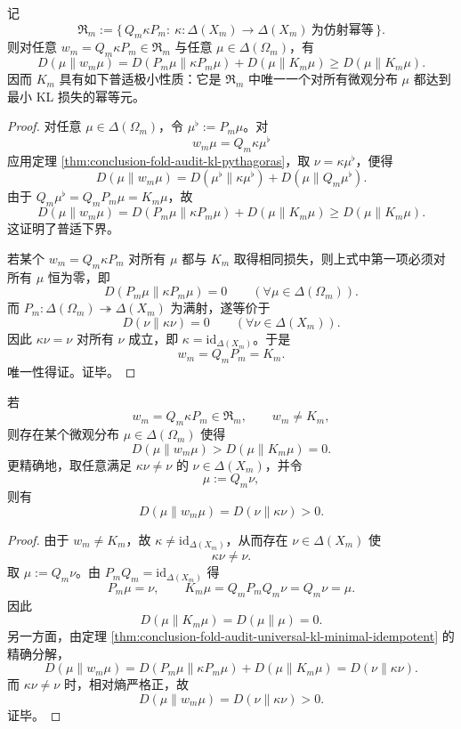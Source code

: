\begin{theorem}[\texorpdfstring{$K_m=Q_mP_m$}{Km=QmPm} 是全部审计幂等中的普适 KL 极小元]\label{thm:conclusion-fold-audit-universal-kl-minimal-idempotent}
记
\[
\mathfrak R_m:=
\{\,Q_m\kappa P_m:\ \kappa:\Delta(X_m)\to\Delta(X_m)\ \text{为仿射幂等}\,\}.
\]
则对任意 \(w_m=Q_m\kappa P_m\in\mathfrak R_m\) 与任意 \(\mu\in\Delta(\Omega_m)\)，有
\[
D(\mu\|w_m\mu)
=
D(P_m\mu\|\kappa P_m\mu)+D(\mu\|K_m\mu)
\ge
D(\mu\|K_m\mu).
\]
因而 \(K_m\) 具有如下普适极小性质：它是 \(\mathfrak R_m\) 中唯一一个对所有微观分布 \(\mu\) 都达到最小 KL 损失的幂等元。
\end{theorem}
\begin{proof}
对任意 \(\mu\in\Delta(\Omega_m)\)，令 \(\mu^\flat:=P_m\mu\)。对
\[
w_m\mu=Q_m\kappa\mu^\flat
\]
应用定理 \ref{thm:conclusion-fold-audit-kl-pythagoras}，取 \(\nu=\kappa\mu^\flat\)，便得
\[
D(\mu\|w_m\mu)
=
D(\mu^\flat\|\kappa\mu^\flat)+D(\mu\|Q_m\mu^\flat).
\]
由于 \(Q_m\mu^\flat=Q_mP_m\mu=K_m\mu\)，故
\[
D(\mu\|w_m\mu)
=
D(P_m\mu\|\kappa P_m\mu)+D(\mu\|K_m\mu)
\ge
D(\mu\|K_m\mu).
\]
这证明了普适下界。

若某个 \(w_m=Q_m\kappa P_m\) 对所有 \(\mu\) 都与 \(K_m\) 取得相同损失，则上式中第一项必须对所有 \(\mu\) 恒为零，即
\[
D(P_m\mu\|\kappa P_m\mu)=0\qquad (\forall \mu\in\Delta(\Omega_m)).
\]
而 \(P_m:\Delta(\Omega_m)\twoheadrightarrow \Delta(X_m)\) 为满射，遂等价于
\[
D(\nu\|\kappa\nu)=0\qquad (\forall \nu\in\Delta(X_m)).
\]
因此 \(\kappa\nu=\nu\) 对所有 \(\nu\) 成立，即 \(\kappa=\mathrm{id}_{\Delta(X_m)}\)。于是
\[
w_m=Q_mP_m=K_m.
\]
唯一性得证。证毕。
\end{proof}

\begin{theorem}\label{thm:conclusion-fold-audit-nonminimal-idempotent-pointwise-kl-witness}
若
\[
w_m=Q_m\kappa P_m\in\mathfrak R_m,
\qquad
w_m\neq K_m,
\]
则存在某个微观分布 \(\mu\in\Delta(\Omega_m)\) 使得
\[
D(\mu\|w_m\mu)>D(\mu\|K_m\mu)=0.
\]
更精确地，取任意满足 \(\kappa\nu\neq \nu\) 的 \(\nu\in\Delta(X_m)\)，并令
\[
\mu:=Q_m\nu,
\]
则有
\[
D(\mu\|w_m\mu)=D(\nu\|\kappa\nu)>0.
\]
\end{theorem}
\begin{proof}
由于 \(w_m\neq K_m\)，故 \(\kappa\neq \mathrm{id}_{\Delta(X_m)}\)，从而存在 \(\nu\in\Delta(X_m)\) 使
\[
\kappa\nu\neq \nu.
\]
取 \(\mu:=Q_m\nu\)。由 \(P_mQ_m=\mathrm{id}_{\Delta(X_m)}\) 得
\[
P_m\mu=\nu,
\qquad
K_m\mu=Q_mP_mQ_m\nu=Q_m\nu=\mu.
\]
因此
\[
D(\mu\|K_m\mu)=D(\mu\|\mu)=0.
\]
另一方面，由定理 \ref{thm:conclusion-fold-audit-universal-kl-minimal-idempotent} 的精确分解，
\[
D(\mu\|w_m\mu)
=
D(P_m\mu\|\kappa P_m\mu)+D(\mu\|K_m\mu)
=
D(\nu\|\kappa\nu).
\]
而 \(\kappa\nu\neq \nu\) 时，相对熵严格正，故
\[
D(\mu\|w_m\mu)=D(\nu\|\kappa\nu)>0.
\]
证毕。
\end{proof}


